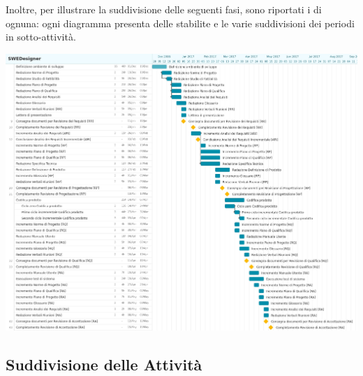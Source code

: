 Inoltre, per illustrare la suddivisione delle seguenti fasi, sono riportati i  di ognuna: ogni diagramma presenta delle  stabilite e le varie suddivisioni dei periodi in sotto-attività.
\newpage
{\includegraphics[width=15cm]{img/ganttweeks.jpg}\par}

\subsection{Suddivisione delle Attività}
